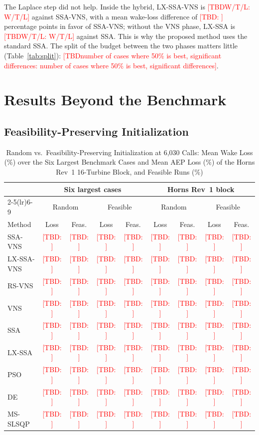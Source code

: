 \documentclass[journal,twoside]{IEEEtran}
\newcommand{\TBD}[1]{\textcolor{red}{[TBD\ifx\relax#1\relax\else: #1\fi]}}
\begin{document}
The Laplace step did not help. Inside the hybrid, LX-SSA-VNS is \TBD{W/T/L} against SSA-VNS, with a mean wake-loss difference of \TBD{} percentage points in favor of SSA-VNS; without the VNS phase, LX-SSA is \TBD{W/T/L} against SSA. This is why the proposed method uses the standard SSA. The split of the budget between the two phases matters little (Table~\ref{tab:split}): \TBD{number of cases where 50\% is best, significant differences}.

\section{Results Beyond the Benchmark}
\label{sec:beyond}

\subsection{Feasibility-Preserving Initialization}
\label{sec:feasinit}
\begin{table}[!t]
\centering
\caption{Random vs.\ Feasibility-Preserving Initialization at 6,030 Calls: Mean Wake Loss (\%) over the Six Largest Benchmark Cases and Mean AEP Loss (\%) of the Horns Rev~1 16-Turbine Block, and Feasible Runs (\%)}
\label{tab:feasinit}
\scriptsize\setlength{\tabcolsep}{2.5pt}
\begin{tabular}{lcccccccc}
\toprule
& \multicolumn{4}{c}{Six largest cases} & \multicolumn{4}{c}{Horns Rev~1 block} \\
\cmidrule(lr){2-5}\cmidrule(lr){6-9}
& \multicolumn{2}{c}{Random} & \multicolumn{2}{c}{Feasible} & \multicolumn{2}{c}{Random} & \multicolumn{2}{c}{Feasible} \\
Method & Loss & Feas. & Loss & Feas. & Loss & Feas. & Loss & Feas. \\
\midrule
SSA-VNS & \TBD{} & \TBD{} & \TBD{} & \TBD{} & \TBD{} & \TBD{} & \TBD{} & \TBD{} \\
LX-SSA-VNS & \TBD{} & \TBD{} & \TBD{} & \TBD{} & \TBD{} & \TBD{} & \TBD{} & \TBD{} \\
RS-VNS & \TBD{} & \TBD{} & \TBD{} & \TBD{} & \TBD{} & \TBD{} & \TBD{} & \TBD{} \\
VNS & \TBD{} & \TBD{} & \TBD{} & \TBD{} & \TBD{} & \TBD{} & \TBD{} & \TBD{} \\
SSA & \TBD{} & \TBD{} & \TBD{} & \TBD{} & \TBD{} & \TBD{} & \TBD{} & \TBD{} \\
LX-SSA & \TBD{} & \TBD{} & \TBD{} & \TBD{} & \TBD{} & \TBD{} & \TBD{} & \TBD{} \\
PSO & \TBD{} & \TBD{} & \TBD{} & \TBD{} & \TBD{} & \TBD{} & \TBD{} & \TBD{} \\
DE & \TBD{} & \TBD{} & \TBD{} & \TBD{} & \TBD{} & \TBD{} & \TBD{} & \TBD{} \\
MS-SLSQP & \TBD{} & \TBD{} & \TBD{} & \TBD{} & \TBD{} & \TBD{} & \TBD{} & \TBD{} \\
\bottomrule
\end{tabular}
\end{table}
\end{document}
